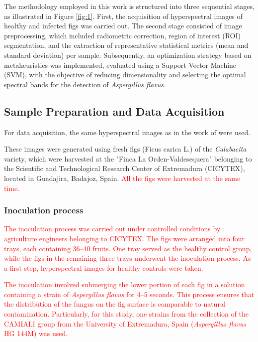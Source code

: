 \documentclass[aipa,article,submit,pdftex,moreauthors]{Definitions/mdpi}
\begin{document}
The methodology employed in this work is structured into three sequential stages, as illustrated in Figure \ref{fig:1}. 
First, the acquisition of hyperspectral images of healthy and infected figs was carried out. 
The second stage consisted of image preprocessing, which included radiometric correction, region of interest (ROI) segmentation, and the extraction of representative statistical metrics (mean and standard deviation) per sample. 
Subsequently, an optimization strategy based on metaheuristics was implemented, evaluated using a Support Vector Machine (SVM), with the objective of reducing dimensionality and selecting the optimal spectral bands for the detection of \textit{Aspergillus flavus}.

\subsection{Sample Preparation and Data Acquisition}

For data acquisition, the same hyperspectral images as in the work of \cite{cruz-carrasco_detection_2024} were used. 

These images were generated using fresh figs (Ficus carica L.) of the \textit{Calabacita} variety, which were harvested at the "Finca La Orden-Valdesequera" belonging to the Scientific and Technological Research Center of Extremadura (CICYTEX), located in Guadajira, Badajoz, Spain. \textcolor{red}{All the figs were harvested at the same time.}

\subsubsection{Inoculation process}
\textcolor{red}{The inoculation process was carried out under controlled conditions by agriculture engineers belonging to CICYTEX. The figs were arranged into four trays, each containing 36--40 fruits. One tray served as the healthy control group, while the figs in the remaining three trays underwent the inoculation process. 
As a first step, hyperspectral images for healthy controls were taken.}

\textcolor{red}{The inoculation involved submerging the lower portion of each fig in a solution containing a strain of \textit{Aspergillus flavus} for 4--5 seconds. This process ensures that the distribution of the fungus on the fig surface is comparable to natural contamination. Particularly, for this study, one strains from the collection of the CAMIALI group from the University of Extremadura, Spain (\textit{Aspergillus flavus} HG 144M) was used.}
\end{document}
